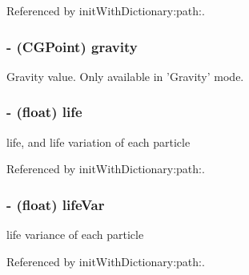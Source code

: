 Referenced by init\-With\-Dictionary\-:path\-:.

\hypertarget{interface_c_c_particle_system_a0d9493d711aae8997874c9119fb67ac2}{
\subsubsection[{gravity}]{\setlength{\rightskip}{0pt plus 5cm}-\/ (C\-G\-Point) {\bf gravity}}}\label{interface_c_c_particle_system_a0d9493d711aae8997874c9119fb67ac2}
Gravity value. Only available in 'Gravity' mode. \hypertarget{interface_c_c_particle_system_a504a0c0a85d96ec6bdce4c5951d4daaf}{
\subsubsection[{life}]{\setlength{\rightskip}{0pt plus 5cm}-\/ (float) {\bf life}}}\label{interface_c_c_particle_system_a504a0c0a85d96ec6bdce4c5951d4daaf}
life, and life variation of each particle 

Referenced by init\-With\-Dictionary\-:path\-:.

\hypertarget{interface_c_c_particle_system_aca3d4efd11d4aec59dcbf44f0f255bbb}{
\subsubsection[{life\-Var}]{\setlength{\rightskip}{0pt plus 5cm}-\/ (float) {\bf life\-Var}}}\label{interface_c_c_particle_system_aca3d4efd11d4aec59dcbf44f0f255bbb}
life variance of each particle 

Referenced by init\-With\-Dictionary\-:path\-:.


